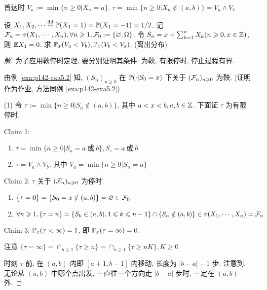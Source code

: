 首达时 $V_a:=\min\{n\geq 0|X_n=a\}$. $\tau=\min\{n\geq 0|X_n\notin (a,b)\}=V_a\land V_b$

\begin{example}[公平游戏中的赌徒破产]\label{exa:p151-exa1}
    设 $X_1,X_2,\cdots\overset{\text{iid}}{\sim} \mathbb{P}(X_1=1)=\mathbb{P}(X_1=-1)=1/2$. 记 $\mathcal{F}_n=\sigma(X_1,\cdots, X_n), \forall n\geqslant 1, \mathcal{F}_0:=\{\varnothing, \Omega\}$. 令 $S_n=x+\sum_{k=1}^n X_k (n\geqslant 0, x\in \mathbb{Z})$, 则 $\mathbb E X_1=0$. 求 $\mathbb{P}_x(V_a<V_b), \mathbb{P}_x(V_b<V_a)$. (离出分布)
\end{example}

\begin{proof}[解]
为了应用鞅停时定理, 要分别证明其条件: 为鞅, 有限停时, 停止过程有界.

由例 \ref{exa:p142-exa5.2} 知, $(S_n)_{n\geq 0}$ 在 $\mathbb{P}(\cdot| S_0=x)$ 下关于 $(\mathcal{F}_n)_{n\geqslant 0}$ 为鞅. (证明作为作业, 方法同例 \ref{exa:p142-exa5.2})

(1) 令 $\tau:=\min\{n\geq 0|S_n\notin (a,b)\}$, 其中 $a<x<b,a,b\in\mathbb{Z}$. 下面证 $\tau$ 为有限停时.

Claim 1:
\begin{enumerate}
    \item $\tau=\min\{n\geq 0| S_n=a\ \text{或}\ b\}, S_{\tau}=a\ \text{或}\ b$
    \item $\tau=V_a\land V_b$, 其中 $V_a=\min\{n\geq 0|S_n=a\}$
\end{enumerate} 

Claim 2: $\tau$ 关于 $(\mathcal{F}_n)_{n\geqslant 0}$ 为停时.
\begin{enumerate}
    \item $\{\tau=0\}=\{S_0=x\notin (a,b)\}=\varnothing\in \mathcal{F}_0$
    \item $\forall n\geqslant 1, \{\tau=n\}=\{S_k\in (a,b),1\leqslant k\leqslant n-1\}\cap \{S_n\notin (a,b)\}\in \sigma(X_1,\cdots,X_n)=\mathcal{F}_n$
\end{enumerate}

Claim 3: $\mathbb{P}_x(\tau<\infty)=1$, 即 $\mathbb{P}_x(\tau=\infty)=0$. 

注意 $\{\tau=\infty\}=\cap_{n\geq 1}\{\tau\geq n\}=\cap_{n\geq 1}\{\tau\geq nK\},K\geq 0$ 

时刻 $\tau$ 前, 在 $(a,b)$ 内即 $[a+1,b-1]$ 内移动, 长度为 $|b-a|-1$ 步. 注意到, 无论从 $(a,b)$ 中哪个点出发, 一直往一个方向走 $|b-a|$ 步时, 一定在 $(a,b)$ 外.


\end{proof}
